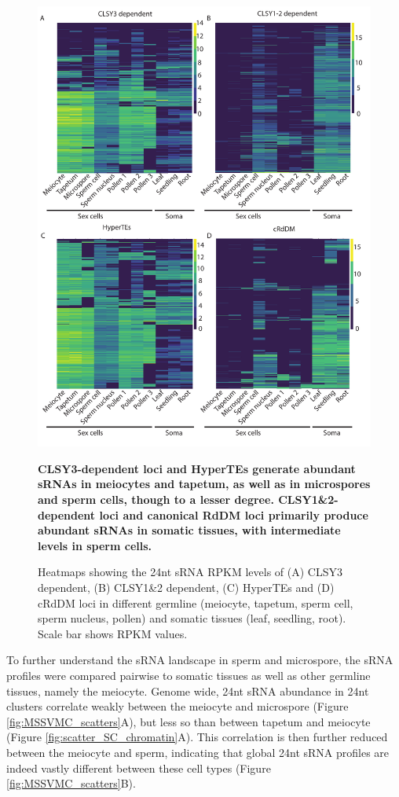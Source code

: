 \begin{figure}[htbp!] 
\centering    
    \includegraphics[width=1\textwidth]{Chapter2/Figs/Figure8_Heatmaps_CLSY3_CLSY1_2vs_cRdDMs_HyperTEs.pdf}
\caption{\textbf{CLSY3-dependent loci and HyperTEs generate abundant sRNAs in meiocytes and tapetum, as well as in microspores and sperm cells, though to a lesser degree. CLSY1\&2-dependent loci and canonical RdDM loci primarily produce abundant sRNAs in somatic tissues, with intermediate levels in sperm cells.}}
\label{fig:hm_CLSY3_CLSY1}
\captionsetup{font=small}
    \caption*{Heatmaps showing the 24nt sRNA RPKM levels of (A) CLSY3 dependent, (B) CLSY1\&2 dependent, (C) HyperTEs and (D) cRdDM loci in different germline (meiocyte, tapetum, sperm cell, sperm nucleus, pollen) and somatic tissues (leaf, seedling, root). Scale bar shows RPKM values.}
\end{figure}

To further understand the sRNA landscape in sperm and microspore, the sRNA profiles were compared pairwise to somatic tissues as well as other germline tissues, namely the meiocyte. Genome wide, 24nt sRNA abundance in 24nt clusters correlate weakly between the meiocyte and microspore (Figure \ref{fig:MSSVMC_scatters}A), but less so than between tapetum and meiocyte (Figure \ref{fig:scatter_SC_chromatin}A). This correlation is then further reduced between the meiocyte and sperm, indicating that global 24nt sRNA profiles are indeed vastly different between these cell types (Figure \ref{fig:MSSVMC_scatters}B).

